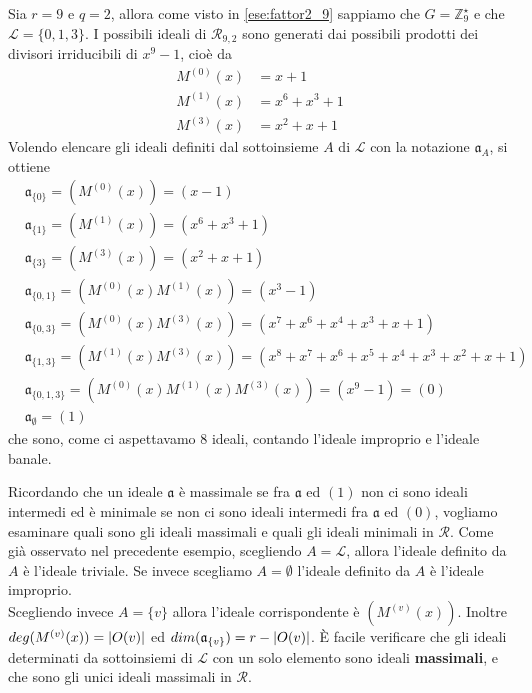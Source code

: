 \begin{esempio}
   Sia $r = 9$ e $q = 2$, allora come visto in \ref{ese:fattor2_9} sappiamo che $ G = \mathbb{Z}_{9}^{\star} $ e che $\mathscr{L} = \lbrace 0,1,3 \rbrace$. I possibili ideali di $\mathcal{R}_{9,2} $ sono generati dai possibili prodotti dei divisori irriducibili di $x^9-1$, cioè da
   \begin{align*}
      M^{(0)}(x)&= x+1\\
      M^{(1)}(x) &= x^6+x^3+1\\
      M^{(3)}(x) &= x^2+x+1
   \end{align*}
   Volendo elencare gli ideali definiti dal sottoinsieme $A$ di $\mathscr{L} $ con la notazione $\mathfrak{a}_{A}$, si ottiene
   \begin{align*}
      &\mathfrak{a}_{\lbrace 0 \rbrace} = (M^{(0)}(x)) = (x-1) \\
      &\mathfrak{a}_{\lbrace 1 \rbrace} = (M^{(1)}(x)) = (x^6+x^3+1) \\
      &\mathfrak{a}_{\lbrace 3 \rbrace} = (M^{(3)}(x)) = (x^2+x+1) \\
      &\mathfrak{a}_{\lbrace 0,1 \rbrace} = (M^{(0)}(x)M^{(1)}(x)) = (x^3 -1) \\
      &\mathfrak{a}_{\lbrace 0,3 \rbrace} = (M^{(0)}(x)M^{(3)}(x)) = (x^7 + x^6 + x^4 + x^3 + x + 1) \\
      &\mathfrak{a}_{\lbrace 1,3 \rbrace}
                    = (M^{(1)}(x)M^{(3)}(x)) = (x^8 +x^7 +x^6 + x^5 + x^4 + x^3 + x^2 + x + 1) \\
      &\mathfrak{a}_{\lbrace 0,1,3 \rbrace} = (M^{(0)}(x)M^{(1)}(x)M^{(3)}(x)) = (x^9 -1) = (0) \\
      &\mathfrak{a}_{\emptyset} = (1)
   \end{align*}
   che sono, come ci aspettavamo $8$ ideali, contando l'ideale improprio e l'ideale banale.
\end{esempio}
Ricordando che un ideale $\mathfrak{a}$ è massimale se fra $\mathfrak{a}$ ed $(1)$ non ci sono ideali intermedi ed è minimale se non ci sono ideali intermedi fra $\mathfrak{a}$ ed $(0)$, vogliamo esaminare quali sono gli ideali massimali e quali gli ideali minimali in $\mathcal{R}$. Come già osservato nel precedente esempio, scegliendo $A = \mathscr{L}$, allora l'ideale definito da $A$ è l'ideale triviale. Se invece scegliamo $A = \emptyset$ l'ideale definito da $A$ è l'ideale improprio. \\
Scegliendo invece $A = \lbrace v \rbrace$ allora l'ideale corrispondente è $(M^{(v)}(x))$. Inoltre $deg(M^{(v)}(x)) = \arrowvert O(v) \arrowvert$ ed $dim(\mathfrak{a}_{\lbrace v \rbrace}) = r - \arrowvert O(v) \arrowvert$. È facile verificare che gli ideali determinati da sottoinsiemi di $\mathscr{L}$ con un solo elemento sono ideali {\bf massimali}, e che sono gli unici ideali massimali in $\mathcal{R}$.\\
